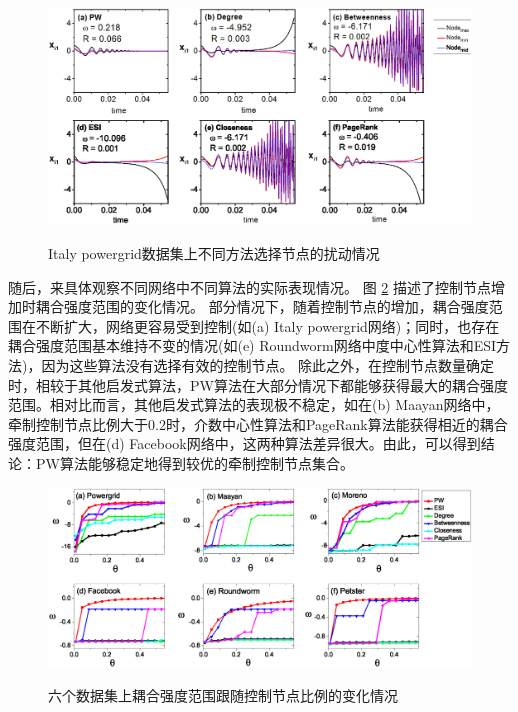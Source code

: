 \begin{figure}[ht]%
	\centering
	\includegraphics[width=1\columnwidth]{chapter4Fig/perturbation.eps}\\
	\caption{Italy powergrid数据集上不同方法选择节点的扰动情况}
	\label{Fig: perturbation}	
	
\end{figure}


随后，来具体观察不同网络中不同算法的实际表现情况。
图 \ref{Fig: omega} 描述了控制节点增加时耦合强度范围的变化情况。
部分情况下，随着控制节点的增加，耦合强度范围在不断扩大，网络更容易受到控制(如(a) Italy powergrid网络)；同时，也存在耦合强度范围基本维持不变的情况(如(e) Roundworm网络中度中心性算法和ESI方法)，因为这些算法没有选择有效的控制节点。
除此之外，在控制节点数量确定时，相较于其他启发式算法，PW算法在大部分情况下都能够获得最大的耦合强度范围。相对比而言，其他启发式算法的表现极不稳定，如在(b) Maayan网络中，牵制控制节点比例大于$ 0.2 $时，介数中心性算法和PageRank算法能获得相近的耦合强度范围，但在(d) Facebook网络中，这两种算法差异很大。由此，可以得到结论：PW算法能够稳定地得到较优的牵制控制节点集合。

\begin{figure}[htb]%
	\centering
	\includegraphics[width=1\columnwidth]{chapter4Fig/omega.eps}\\
	\caption{六个数据集上耦合强度范围跟随控制节点比例的变化情况}
	\label{Fig: omega}	
	
\end{figure}

